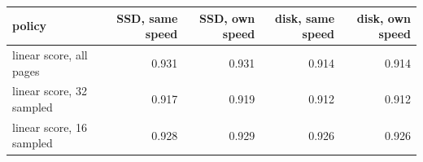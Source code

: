 \begin{tabular}{lrrrr}
\toprule
policy & SSD, same speed & SSD, own speed & disk, same speed & disk, own speed \\
\midrule
linear score, all pages & 0.931 & 0.931 & 0.914 & 0.914 \\
linear score, 32 sampled & 0.917 & 0.919 & 0.912 & 0.912 \\
linear score, 16 sampled & 0.928 & 0.929 & 0.926 & 0.926 \\
\bottomrule
\end{tabular}

